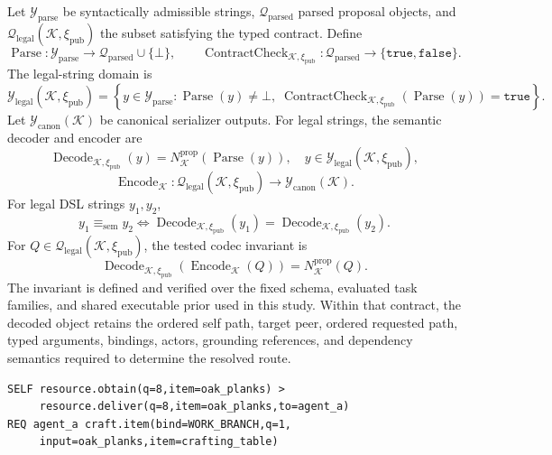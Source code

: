 \documentclass[10pt]{article}
\begin{document}
Let $\mathcal Y_{\mathrm{parse}}$ be syntactically admissible strings, $\mathcal Q_{\mathrm{parsed}}$ parsed proposal objects, and $\mathcal Q_{\mathrm{legal}}(\mathcal K,\xi_{\mathrm{pub}})$ the subset satisfying the typed contract. Define
\[
\operatorname{Parse}:\mathcal Y_{\mathrm{parse}}\rightarrow\mathcal Q_{\mathrm{parsed}}\cup\{\bot\},
\qquad
\operatorname{ContractCheck}_{\mathcal K,\xi_{\mathrm{pub}}}:\mathcal Q_{\mathrm{parsed}}\rightarrow\{\mathtt{true},\mathtt{false}\}.
\]
The legal-string domain is
\[
\mathcal Y_{\mathrm{legal}}(\mathcal K,\xi_{\mathrm{pub}})
=
\left\{y\in\mathcal Y_{\mathrm{parse}}:\operatorname{Parse}(y)\neq\bot,\;
\operatorname{ContractCheck}_{\mathcal K,\xi_{\mathrm{pub}}}(\operatorname{Parse}(y))=\mathtt{true}\right\}.
\]
Let $\mathcal Y_{\mathrm{canon}}(\mathcal K)$ be canonical serializer outputs. For legal strings, the semantic decoder and encoder are
\[
\operatorname{Decode}_{\mathcal K,\xi_{\mathrm{pub}}}(y)
=
N_{\mathcal K}^{\mathrm{prop}}\!\left(\operatorname{Parse}(y)\right),
\quad y\in\mathcal Y_{\mathrm{legal}}(\mathcal K,\xi_{\mathrm{pub}}),
\]
\[
\operatorname{Encode}_{\mathcal K}:\mathcal Q_{\mathrm{legal}}(\mathcal K,\xi_{\mathrm{pub}})\rightarrow\mathcal Y_{\mathrm{canon}}(\mathcal K).
\]
For legal DSL strings $y_1,y_2$,
\begin{equation}
y_1\equiv_{\mathrm{sem}}y_2
\iff
\operatorname{Decode}_{\mathcal K,\xi_{\mathrm{pub}}}(y_1)
=
\operatorname{Decode}_{\mathcal K,\xi_{\mathrm{pub}}}(y_2).
\end{equation}
For $Q\in\mathcal Q_{\mathrm{legal}}(\mathcal K,\xi_{\mathrm{pub}})$, the tested codec invariant is
\begin{equation}
\operatorname{Decode}_{\mathcal K,\xi_{\mathrm{pub}}}(\operatorname{Encode}_{\mathcal K}(Q))
=
N_{\mathcal K}^{\mathrm{prop}}(Q).
\end{equation}
The invariant is defined and verified over the fixed schema, evaluated task families, and shared executable prior used in this study. Within that contract, the decoded object retains the ordered self path, target peer, ordered requested path, typed arguments, bindings, actors, grounding references, and dependency semantics required to determine the resolved route.

\begin{lstlisting}[style=gcpdsl]
SELF resource.obtain(q=8,item=oak_planks) >
     resource.deliver(q=8,item=oak_planks,to=agent_a)
REQ agent_a craft.item(bind=WORK_BRANCH,q=1,
     input=oak_planks,item=crafting_table)
\end{lstlisting}
\end{document}
